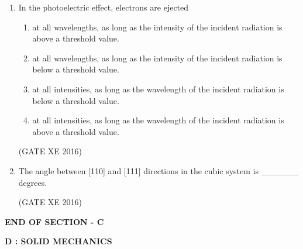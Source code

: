 \documentclass[12pt]{article}
\begin{document}
\begin{enumerate}
(GATE XE 2016)

\item In the photoelectric effect, electrons are ejected  

\begin{enumerate}
\item at all wavelengths, as long as the intensity of the incident radiation is above a threshold value.  
\item at all wavelengths, as long as the intensity of the incident radiation is below a threshold value.  
\item at all intensities, as long as the wavelength of the incident radiation is below a threshold value.  
\item at all intensities, as long as the wavelength of the incident radiation is above a threshold value.  
\end{enumerate}

(GATE XE 2016)

\item The angle between [110] and [111] directions in the cubic system is \_\_\_\_\_\_
degrees.

(GATE XE 2016)


\end{enumerate}

\begin{center}
    \textbf{END OF SECTION - C}
\end{center}

\newpage

\begin{center}
    {\Large \textbf{D : SOLID MECHANICS}}
\end{center}
\end{document}
